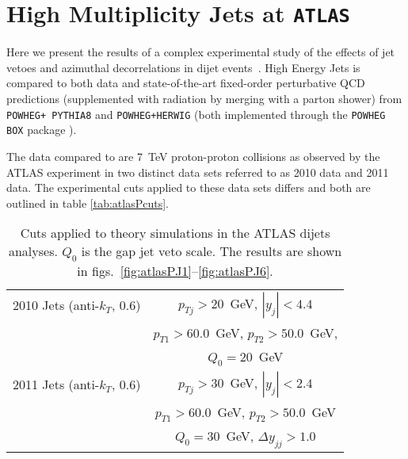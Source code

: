 \chapter{High Multiplicity Jets at \texttt{ATLAS}}
\label{chap:ATLAS}

	Here we present the results of a complex experimental study of the effects of jet vetoes and
	azimuthal decorrelations in dijet events~\cite{Aad:2014pua}.  High Energy Jets is compared
	to both data and state-of-the-art fixed-order perturbative QCD predictions (supplemented with
	radiation by merging with a parton shower) from \texttt{POWHEG+
	PYTHIA8} and \texttt{POWHEG+HERWIG} (both implemented through the \texttt{POWHEG BOX} package
	\cite{1126-6708-2004-11-040}).

	The data compared to are 7~TeV proton-proton collisions as observed by the ATLAS
	experiment in two distinct data sets referred to as 2010 data and 2011 data.  The
	experimental cuts applied to these data sets differs and both are outlined in table
	\eqref{tab:atlasPcuts}.

	\begin{table}[bth]
	  \centering
	  \begin{tabular}{|l|c|}
	    \hline
	    2010 Jets (anti-$k_T$, 0.6) & $p_{Tj}>20$~GeV, \; $|y_j|<4.4$ \\
	    & $p_{T1}> 60.0$~GeV, \; $p_{T2}> 50.0$~GeV, \; \\
	    & $Q_0=20$~GeV \\
	    \hline
	    2011 Jets (anti-$k_T$, 0.6) & $p_{Tj}>30$~GeV, \; $|y_j|<2.4$ \\
	    & $p_{T1}> 60.0$~GeV, \; $p_{T2}> 50.0$~GeV \\
	    & \; $Q_0=30$~GeV, \; $\Delta y_{jj}>1.0$\\
	\hline
	  \end{tabular}
	  \caption{Cuts applied to theory simulations in the ATLAS dijets analyses.
	  $Q_0$ is the gap jet veto scale. The results are shown in
	  figs.~\eqref{fig:atlasPJ1}--\eqref{fig:atlasPJ6}.}
	  \label{tab:atlasPcuts}
	\end{table}

